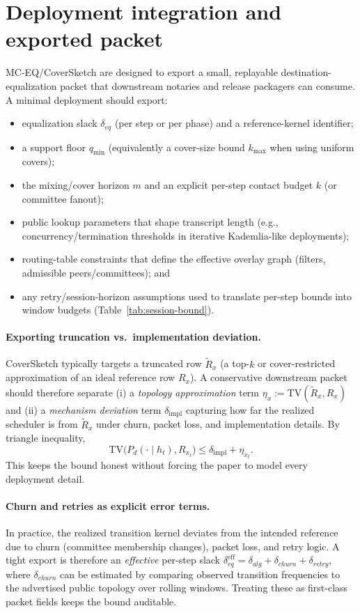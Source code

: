 \documentclass[11pt]{article}
\newcommand{\TV}{\mathrm{TV}}
\begin{document}
\section{Deployment integration and exported packet}
\label{sec:deploy}
MC-EQ/CoverSketch are designed to export a small, replayable destination-equalization packet that downstream notaries and release packagers can consume.\cite{series:release}
A minimal deployment should export:
\begin{itemize}[leftmargin=1.3em]
\item equalization slack $\delta_{eq}$ (per step or per phase) and a reference-kernel identifier;
\item a support floor $q_{\min}$ (equivalently a cover-size bound $k_{\max}$ when using uniform covers);
\item the mixing/cover horizon $m$ and an explicit per-step contact budget $k$ (or committee fanout);
\item public lookup parameters that shape transcript length (e.g., concurrency/termination thresholds in iterative Kademlia-like deployments);
\item routing-table constraints that define the effective overlay graph (filters, admissible peers/committees); and
\item any retry/session-horizon assumptions used to translate per-step bounds into window budgets (Table~\ref{tab:session-bound}).
\end{itemize}

\paragraph{Exporting truncation vs.\ implementation deviation.}
CoverSketch typically targets a truncated row $\widetilde R_x$ (a top-$k$ or cover-restricted approximation of an ideal reference row $R_x$).
A conservative downstream packet should therefore separate
(i) a \emph{topology approximation} term $\eta_x:=\TV(\widetilde R_x,R_x)$ and
(ii) a \emph{mechanism deviation} term $\delta_{\mathrm{impl}}$ capturing how far the realized scheduler is from $\widetilde R_x$ under churn, packet loss, and implementation details.
By triangle inequality,
\[
\TV\big(P_d(\cdot\mid h_t),R_{x_t}\big)\le \delta_{\mathrm{impl}} + \eta_{x_t}.
\]
This keeps the bound honest without forcing the paper to model every deployment detail.

\paragraph{Churn and retries as explicit error terms.}
In practice, the realized transition kernel deviates from the intended reference due to churn (committee membership changes), packet loss, and retry logic.
A tight export is therefore an \emph{effective} per-step slack
$\delta_{eq}^{\mathrm{eff}}=\delta_{alg}+\delta_{churn}+\delta_{retry}$,
where $\delta_{churn}$ can be estimated by comparing observed transition frequencies to the advertised public topology over rolling windows.
Treating these as first-class packet fields keeps the bound auditable.
\end{document}

